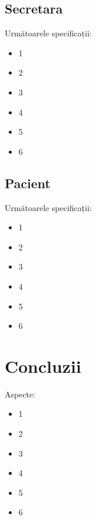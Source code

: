 \documentclass[a4paper,12pt]{article}
\begin{document}
\subsection{Secretara}

Următoarele specificații:

\begin{itemize}
\item 1
\item 2
\item 3
\item 4
\item 5
\item 6
\end{itemize}

\subsection{Pacient}

Următoarele specificații:

\begin{itemize}
\item 1
\item 2
\item 3
\item 4
\item 5
\item 6
\end{itemize}

\section{Concluzii}

Aspecte:

\begin{itemize}
\item 1
\item 2
\item 3
\item 4
\item 5
\item 6
\end{itemize}
\end{document}
